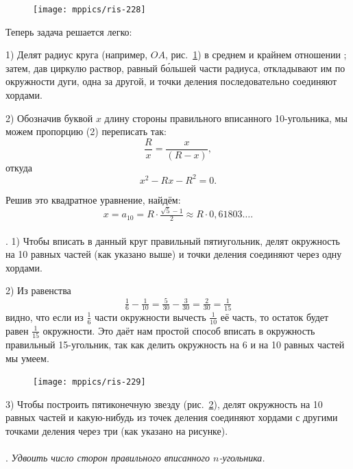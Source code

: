 \documentclass[oneside]{book}
\begin{document}
\begin{figure}
\centering
\texttt{[image: mppics/ris-228]}
\caption{}\label{1938/ris-228}
\end{figure}

Теперь задача решается легко:

1) Делят радиус круга (например, $OA$, рис.~\ref{1938/ris-228}) в среднем и крайнем отношении%
;
затем, дав циркулю раствор, равный б\'{о}льшей части радиуса, откладывают им по окружности дуги, одна за другой, и точки деления последовательно соединяют хордами.

2) Обозначив буквой $x$ длину стороны правильного вписанного 10-угольника, мы можем пропорцию (2) переписать так:
\[\frac Rx=\frac x{(R-x)},\]
откуда
\[x^2-Rx-R^2=0.\]

Решив это квадратное уравнение, найдём:
\[x=a_{10}=R\cdot\tfrac{\sqrt5-1}{2}\approx R \cdot  0{,}61803\dots.\]

\paragraph{}\label{1938/223}
\mbox{.}
1) Чтобы вписать в данный круг правильный пятиугольник, делят окружность на 10 равных частей (как указано выше) и точки деления соединяют через одну хордами.

2) Из равенства
\[\tfrac16-\tfrac1{10}=\tfrac5{30}-\tfrac3{30}=\tfrac2{30}=\tfrac1{15}\]
видно, что если из $\tfrac16$ части окружности вычесть $\tfrac1{10}$ её часть, то остаток будет равен $\tfrac1{15}$ окружности.
Это даёт нам простой способ вписать в окружность правильный 15-угольник, так как делить окружность на 6 и на 10 равных частей мы умеем.

\begin{figure}
\centering
\texttt{[image: mppics/ris-229]}
\caption{}\label{1938/ris-229}
\end{figure}

3) Чтобы построить пятиконечную звезду (рис.~\ref{1938/ris-229}), делят окружность на 10 равных частей и какую-нибудь из точек деления соединяют хордами с другими точками деления через три (как указано на рисунке).

\paragraph{}\label{1938/224}
\mbox{.}
\emph{Удвоить число сторон правильного вписанного $n$-угольника.}
\end{document}
